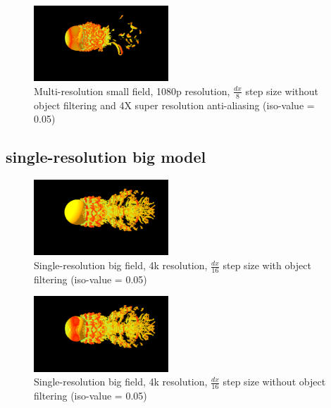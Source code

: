 \documentclass[acmtog]{acmart}
\begin{document}
    \begin{figure}[H]
        \centering
        \includegraphics[width=0.45\textwidth]{./image/multi_small_1080p_8_no_filter_4XRES}
        \caption{Multi-resolution small field, 1080p resolution, $ \frac{dx}{8} $ step size without object filtering and 4X super resolution anti-aliasing (iso-value = 0.05)}\label{fig:figure8}
    \end{figure}

    \subsection{single-resolution big model}\label{subsec:single-resolution-big-model}
    \begin{figure}[H]
        \centering
        \includegraphics[width=0.45\textwidth]{./image/single_big_4k_16_filter}
        \caption{Single-resolution big field, 4k resolution, $ \frac{dx}{16} $ step size with object filtering (iso-value = 0.05)}\label{fig:figure9}
    \end{figure}

    \begin{figure}[H]
        \centering
        \includegraphics[width=0.45\textwidth]{./image/single_big_4k_16_no_filter}
        \caption{Single-resolution big field, 4k resolution, $ \frac{dx}{16} $ step size without object filtering (iso-value = 0.05)}\label{fig:figure10}
    \end{figure}
\end{document}
